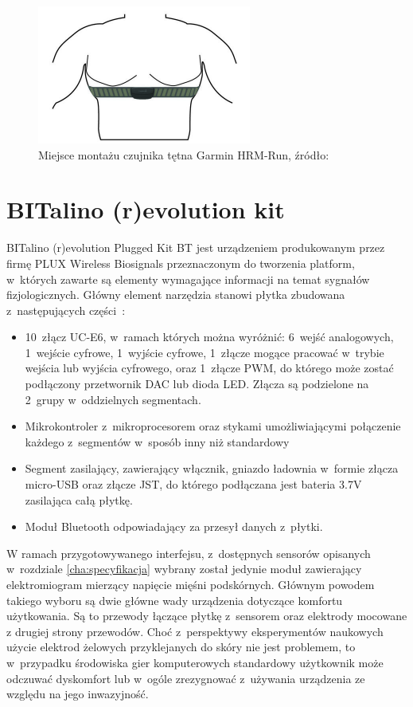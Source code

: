 \begin{figure}
	\centering
	\includegraphics[width=0.5\linewidth]{images/garmin_hrm_placement.png}
	\caption{Miejsce montażu czujnika tętna Garmin HRM-Run, źródło:~\cite{garmin_manual}}
	\label{fig:garmin_placement}
\end{figure}

\section{BITalino (r)evolution kit}
BITalino (r)evolution Plugged Kit BT jest urządzeniem produkowanym przez firmę PLUX Wireless Biosignals przeznaczonym do tworzenia platform, w~których zawarte są elementy wymagające informacji na temat sygnałów fizjologicznych. Główny element narzędzia stanowi płytka zbudowana z~następujących części~\cite{bitalino_documentation}:
\begin{itemize}
	\item 10~złącz UC-E6, w~ramach których można wyróżnić: 6~wejść analogowych, 1~wejście cyfrowe, 1~wyjście cyfrowe, 1~złącze mogące pracować w~trybie wejścia lub wyjścia cyfrowego, oraz 1~złącze PWM, do którego może zostać podłączony przetwornik DAC lub dioda LED. Złącza są podzielone na 2~grupy w~oddzielnych segmentach.
	\item Mikrokontroler z~mikroprocesorem oraz stykami umożliwiającymi połączenie każdego z~segmentów w~sposób inny niż standardowy
	\item Segment zasilający, zawierający włącznik, gniazdo ładownia w~formie złącza micro-USB oraz złącze JST, do którego podłączana jest bateria 3.7V zasilająca całą płytkę.
	\item Moduł Bluetooth odpowiadający za przesył danych z~płytki.
\end{itemize}

W ramach przygotowywanego interfejsu, z~dostępnych sensorów opisanych w~rozdziale \ref{cha:specyfikacja} wybrany został jedynie moduł zawierający elektromiogram mierzący napięcie mięśni podskórnych. Głównym powodem takiego wyboru są dwie główne wady urządzenia dotyczące komfortu użytkowania. Są to przewody łączące płytkę z~sensorem oraz elektrody mocowane z drugiej strony przewodów. Choć z~perspektywy eksperymentów naukowych użycie elektrod żelowych przyklejanych do skóry nie jest problemem, to w~przypadku środowiska gier komputerowych standardowy użytkownik może odczuwać dyskomfort lub w~ogóle zrezygnować z~używania urządzenia ze względu na jego inwazyjność.

